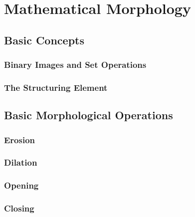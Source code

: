 \section{Mathematical Morphology} 
\label{booksection_75_Mathematical_Morphology}
\subsection{Basic Concepts} 
\label{booksection_76_Basic_Concepts}
\subsubsection{Binary Images and Set Operations} 
\label{booksection_77_Binary_Images_and_Set_Operations}

\subsubsection{The Structuring Element} 
\label{booksection_78_The_Structuring_Element}

\subsection{Basic Morphological Operations} 
\label{booksection_79_Basic_Morphological_Operations}
\subsubsection{Erosion} 
\label{booksection_80_Erosion}

\subsubsection{Dilation} 
\label{booksection_81_Dilation}

\subsubsection{Opening} 
\label{booksection_82_Opening}

\subsubsection{Closing} 
\label{booksection_83_Closing}

